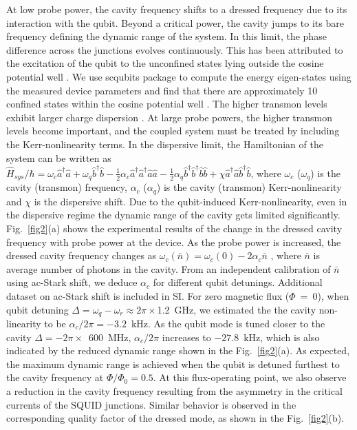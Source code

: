 \documentclass[a4paper, amsfonts, amssymb, amsmath, reprint,showkeys,nofootinbib,superscriptaddress]{revtex4-2}
\begin{document}
%
At low probe power, the cavity frequency shifts to a 
dressed frequency due to its interaction with the qubit.
%
Beyond a critical power, the cavity jumps to its bare frequency defining the 
dynamic range of the system. 
%
In this limit, the phase difference across the junctions evolves continuously.
This has been attributed to the excitation of the qubit to the unconfined 
states lying outside the cosine potential well \cite{lescanne_escape_2019}.
%
We use scqubits package to compute the energy eigen-states using the 
measured device parameters and find that there are approximately 10 confined
states within the cosine potential well \cite{groszkowski_scqubits_2021}.
The higher transmon levels exhibit larger charge dispersion \cite{koch_charge-insensitive_2007}.
%
At large probe powers, the higher transmon levels become important,
and the coupled system must be treated by including the Kerr-nonlinearity 
terms. In the dispersive limit, the Hamiltonian of the system can be written as 
$\hat{H}_{sys}/\hbar = \omega_c \hat{a}^{\dagger}\hat{a}+\omega_q 
\hat{b}^{\dagger}\hat{b} - 
\frac{1}{2}\alpha_c\hat{a}^{\dagger}\hat{a}^{\dagger}\hat{a}\hat{a} -
\frac{1}{2}\alpha_q\hat{b}^{\dagger}\hat{b}^{\dagger}\hat{b}\hat{b} +
\chi\hat{a}^{\dagger}\hat{a}\hat{b}^{\dagger}\hat{b}$, where $\omega_c$ 
($\omega_q$) is the cavity 
(transmon) frequency, $\alpha_c$ ($\alpha_q$) is the cavity (transmon) 
Kerr-nonlinearity and $\chi$ is the dispersive shift. 
Due to the qubit-induced Kerr-nonlinearity, even in the dispersive regime the dynamic range of the cavity 
gets limited significantly.
%
Fig.~\ref{fig2}(a) shows the experimental results of the change in the dressed 
cavity frequency with probe power at the device. 
%
As the probe power is increased, the dressed cavity frequency changes as
$\omega_c(\bar{n})=\omega_c(0) -2\alpha_c\bar{n}$ \cite{leghtas_confining_2015}, 
where $\bar{n}$ is average number of photons in the cavity.
%
From an independent calibration of $\bar{n}$ using ac-Stark shift, we deduce 
$\alpha_c$ for different qubit detunings. Additional dataset on ac-Stark shift 
is included in SI.
%
For zero magnetic flux ($\Phi~=~0$), when qubit detuning 
$\Delta = \omega_{q} - \omega_{r}\approx2\pi\times$1.2~GHz, we estimated the 
the cavity non-linearity to be $\alpha_c/2\pi = -3.2$~kHz. As the qubit mode 
is tuned closer to the cavity $\Delta=-2\pi\times$~600~MHz, 
$\alpha_c/2\pi$ increases to $-27.8$~kHz, which is also indicated by the
reduced dynamic range shown in the Fig.~\ref{fig2}(a).
%
As expected, the maximum dynamic range is achieved when the qubit is detuned 
furthest to the cavity frequency at $\Phi/\Phi_0=0.5$. 
At this flux-operating point, we also observe a reduction in the cavity
frequency resulting from the asymmetry in the critical currents 
of the SQUID junctions. Similar behavior is observed in the corresponding 
quality factor of the dressed mode, as shown in the Fig.~\ref{fig2}(b).
 
\end{document}
